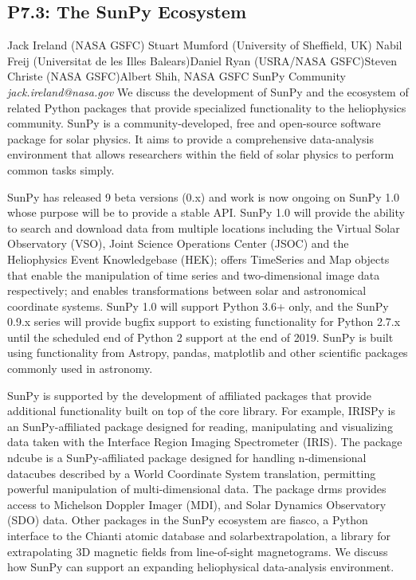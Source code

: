 \documentclass{report}
\begin{document}
\subsection*{P7.3: The SunPy Ecosystem}
\bigskip
Jack Ireland (NASA GSFC) \newline Stuart Mumford (University of Sheffield, UK) \newline  Nabil Freij (Universitat de les Illes Balears)\newline  Daniel Ryan (USRA/NASA GSFC)\newline Steven Christe (NASA GSFC)\newline  Albert Shih, NASA GSFC
SunPy Community\newline\newline
{\it jack.ireland@nasa.gov}\newline
\newline\newline
We discuss the development of SunPy and the ecosystem of related Python packages that provide specialized functionality to the heliophysics community. SunPy is a community-developed, free and open-source software package for solar physics. It aims to provide a comprehensive data-analysis environment that allows researchers within the field of solar physics to perform common tasks simply.  

SunPy has released 9 beta versions (0.x) and work is now ongoing on SunPy 1.0 whose purpose will be to provide a stable API.  SunPy 1.0 will provide the ability to search and download data from multiple locations including the Virtual Solar Observatory (VSO), Joint Science Operations Center (JSOC) and the Heliophysics Event Knowledgebase (HEK); offers TimeSeries and Map objects that enable the manipulation of time series and two-dimensional image data respectively; and enables transformations between solar and astronomical coordinate systems.  SunPy 1.0 will support Python 3.6+ only, and the SunPy 0.9.x series will provide bugfix support to existing functionality for Python 2.7.x until the scheduled end of Python 2 support at the end of 2019. SunPy is built using functionality from Astropy, pandas, matplotlib and other scientific packages commonly used in astronomy.

SunPy is supported by the development of affiliated packages that provide additional functionality built on top of the core library. For example, IRISPy is an SunPy-affiliated package designed for reading, manipulating and visualizing data taken with the Interface Region Imaging Spectrometer (IRIS).  The package ndcube is a SunPy-affiliated package designed for handling n-dimensional datacubes described by a World Coordinate System translation, permitting powerful manipulation of multi-dimensional data. The package drms provides access to Michelson Doppler Imager (MDI), and Solar Dynamics Observatory (SDO) data.  Other packages in the SunPy ecosystem are fiasco, a Python interface to the Chianti atomic database and solarbextrapolation, a library for extrapolating 3D magnetic fields from line-of-sight magnetograms.  We discuss how SunPy can support an expanding heliophysical data-analysis environment.\newline
\newpage
\end{document}
